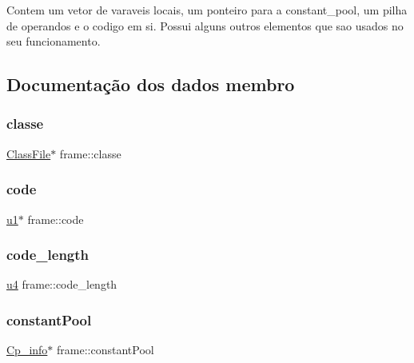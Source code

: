 Contem um vetor de varaveis locais, um ponteiro para a constant\+\_\+pool, um pilha de operandos e o codigo em si. Possui alguns outros elementos que sao usados no seu funcionamento. 

\subsection{Documentação dos dados membro}
\mbox{\label{structframe_ac199820b516dd4d579068706cd43af95}} 
\subsubsection{\texorpdfstring{classe}{classe}}
{\footnotesize\ttfamily \hyperlink{struct_class_file}{Class\+File}$\ast$ frame\+::classe}

\mbox{\label{structframe_a5df0e7929808221d8109562c16e490fc}} 
\subsubsection{\texorpdfstring{code}{code}}
{\footnotesize\ttfamily \hyperlink{util_8h_a64f8055b64cf2a4c299c841130c5c938}{u1}$\ast$ frame\+::code}

\mbox{\label{structframe_a6aecdb355da5ec8d1393bb3bed5fac56}} 
\subsubsection{\texorpdfstring{code\+\_\+length}{code\_length}}
{\footnotesize\ttfamily \hyperlink{util_8h_ae391a1d79bb0c8cbc283f0283e3c098b}{u4} frame\+::code\+\_\+length}

\mbox{\label{structframe_a40e472a4fefc83b9b6920b4c3d0c3b89}} 
\subsubsection{\texorpdfstring{constant\+Pool}{constantPool}}
{\footnotesize\ttfamily \hyperlink{struct_cp__info}{Cp\+\_\+info}$\ast$ frame\+::constant\+Pool}

